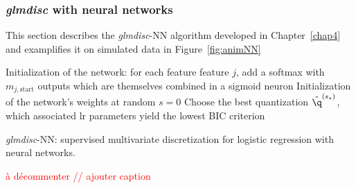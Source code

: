 \subsubsection{\textit{glmdisc} with neural networks} \label{app1:glmdiscNN}

This section describes the \textit{glmdisc}-NN algorithm developed in Chapter~\ref{chap4} and examplifies it on simulated data in Figure~\ref{fig:animNN}

\begin{algorithm}[H]
 Initialization of the network: for each feature feature $j$, add a softmax with $m_{j,\text{start}}$ outputs which are themselves combined in a sigmoid neuron\;
 Initialization of the network's weights at random\;
 $s = 0$\;
 Choose the best quantization $\hat{\q}^{(s_\star)}$, which associated \gls{lr} parameters yield the lowest BIC criterion\;
 \caption{\label{NN-disc} \textit{glmdisc}-NN: supervised multivariate discretization for logistic regression with neural networks.}
\end{algorithm}



\textcolor{red}{à décommenter // ajouter caption}

